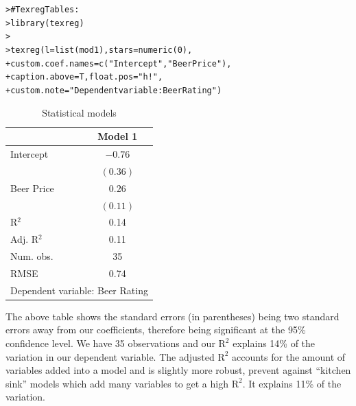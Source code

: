 \documentclass[12pt]{article}\usepackage[]{graphicx}\usepackage[]{color}
\makeatletter
\newcommand{\hlnum}[1]{\textcolor[rgb]{0.82,0.78,0.62}{#1}}%
\newcommand{\hlstr}[1]{\textcolor[rgb]{0.82,0.78,0.62}{#1}}%
\newcommand{\hlcom}[1]{\textcolor[rgb]{0.404,0.408,0.42}{#1}}%
\newcommand{\hlstd}[1]{\textcolor[rgb]{0.882,0.878,0.898}{#1}}%
\newcommand{\hlkwc}[1]{\textcolor[rgb]{0.812,0.522,0.388}{#1}}%
\newcommand{\hlkwd}[1]{\textcolor[rgb]{0.733,0.388,0.812}{#1}}%
\newenvironment{kframe}{%
 \def\at@end@of@kframe{}%
 \ifinner\ifhmode%
  \def\at@end@of@kframe{\end{minipage}}%
  \begin{minipage}{\columnwidth}%
 \fi\fi%
 \def\FrameCommand##1{\hskip\@totalleftmargin \hskip-\fboxsep
 \colorbox{shadecolor}{##1}\hskip-\fboxsep
     \hskip-\linewidth \hskip-\@totalleftmargin \hskip\columnwidth}%
 \MakeFramed {\advance\hsize-\width
   \@totalleftmargin\z@ \linewidth\hsize
   \@setminipage}}%
 {\par\unskip\endMakeFramed%
 \at@end@of@kframe}
\newenvironment{knitrout}{}{} %
\makeatother
\begin{document}
\begin{flushleft}
\begin{knitrout}
\color{fgcolor}\begin{kframe}
\begin{alltt}
\hlstd{> }\hlcom{# Texreg Tables:}
\hlstd{> }\hlkwd{library}\hlstd{(texreg)}
\hlstd{> }
\hlstd{> }\hlkwd{texreg}\hlstd{(}\hlkwc{l}\hlstd{=} \hlkwd{list}\hlstd{(mod1),} \hlkwc{stars} \hlstd{=} \hlkwd{numeric}\hlstd{(}\hlnum{0}\hlstd{),}
\hlstd{+ }       \hlkwc{custom.coef.names}    \hlstd{=} \hlkwd{c}\hlstd{(}\hlstr{"Intercept"}\hlstd{,} \hlstr{"Beer Price"}\hlstd{),}
\hlstd{+ }       \hlkwc{caption.above}        \hlstd{= T,} \hlkwc{float.pos} \hlstd{=} \hlstr{"h!"}\hlstd{,}
\hlstd{+ }       \hlkwc{custom.note}          \hlstd{=} \hlstr{"Dependent variable: Beer Rating"}\hlstd{)}
\end{alltt}
\end{kframe}
\end{knitrout}


\begin{table}[h!]
\caption{Statistical models}
\begin{center}
\begin{tabular}{l c }
\hline
 & Model 1 \\
\hline
Intercept  & $-0.76$  \\
           & $(0.36)$ \\
Beer Price & $0.26$   \\
           & $(0.11)$ \\
\hline
R$^2$      & 0.14     \\
Adj. R$^2$ & 0.11     \\
Num. obs.  & 35       \\
RMSE       & 0.74     \\
\hline
\multicolumn{2}{l}{\scriptsize{Dependent variable: Beer Rating}}
\end{tabular}
\end{center}
\end{table}



The above table shows the standard errors (in parentheses) being two standard errors away from our coefficients, therefore being significant at the 95\% confidence level. We have 35 observations and our $\text{R}^2$ explains 14\% of the variation in our dependent variable. The adjusted $\text{R}^2$ accounts for the amount of variables added into a model and is slightly more robust, prevent against ``kitchen sink'' models which add many variables to get a high  $\text{R}^2$. It explains 11\% of the variation.


\end{flushleft}
\end{document}
